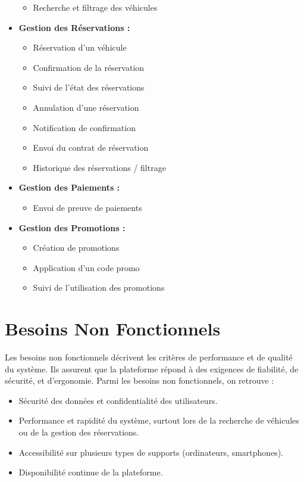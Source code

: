 \begin{itemize}
    \begin{itemize}
        \item Recherche et filtrage des véhicules
    \end{itemize}
    \item \textbf{Gestion des Réservations :}
    \begin{itemize}
        \item Réservation d’un véhicule
        \item Confirmation de la réservation
        \item Suivi de l’état des réservations
        \item Annulation d’une réservation
        \item Notification de confirmation
        \item Envoi du contrat de réservation
        \item Historique des réservations / filtrage
    \end{itemize}
    \item \textbf{Gestion des Paiements :}
    \begin{itemize}
        \item Envoi de preuve de paiements
    \end{itemize}
    \item \textbf{Gestion des Promotions :}
    \begin{itemize}
        \item Création de promotions
        \item Application d’un code promo
        \item Suivi de l’utilisation des promotions
    \end{itemize}
\end{itemize}

\section{Besoins Non Fonctionnels}
Les besoins non fonctionnels décrivent les critères de performance et de qualité du système. Ils assurent que la plateforme répond à des exigences de fiabilité, de sécurité, et d’ergonomie. Parmi les besoins non fonctionnels, on retrouve :
\begin{itemize}
    \item Sécurité des données et confidentialité des utilisateurs.
    \item Performance et rapidité du système, surtout lors de la recherche de véhicules ou de la gestion des réservations.
    \item Accessibilité sur plusieurs types de supports (ordinateurs, smartphones).
    \item Disponibilité continue de la plateforme.

\end{itemize}


